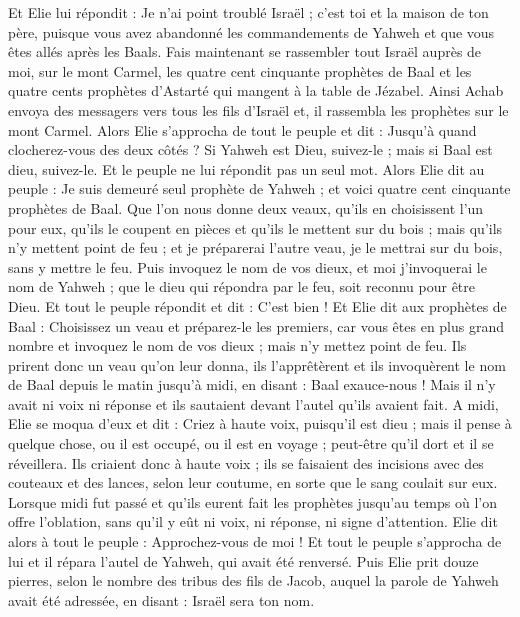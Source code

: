 \begin{multicols}{2}
Et Elie lui répondit : Je n'ai point troublé Israël ; c'est toi et la maison de ton père, puisque vous avez abandonné les commandements de Yahweh et que vous êtes allés après les Baals.
Fais maintenant se rassembler tout Israël auprès de moi, sur le mont Carmel, les quatre cent cinquante prophètes de Baal et les quatre cents prophètes d’Astarté qui mangent à la table de Jézabel.
Ainsi Achab envoya des messagers vers tous les fils d'Israël et, il rassembla les prophètes sur le mont Carmel.
Alors Elie s'approcha de tout le peuple et dit : Jusqu'à quand clocherez-vous des deux côtés ? Si Yahweh est Dieu, suivez-le ; mais si Baal est dieu, suivez-le. Et le peuple ne lui répondit pas un seul mot.
Alors Elie dit au peuple : Je suis demeuré seul prophète de Yahweh ; et voici quatre cent cinquante prophètes de Baal.
Que l’on nous donne deux veaux, qu'ils en choisissent l'un pour eux, qu'ils le coupent en pièces et qu'ils le mettent sur du bois ; mais qu'ils n'y mettent point de feu ; et je préparerai l'autre veau, je le mettrai sur du bois, sans y mettre le feu.
Puis invoquez le nom de vos dieux, et moi j'invoquerai le nom de Yahweh ; que le dieu qui répondra par le feu, soit reconnu pour être Dieu. Et tout le peuple répondit et dit : C'est bien !
Et Elie dit aux prophètes de Baal : Choisissez un veau et préparez-le les premiers, car vous êtes en plus grand nombre et invoquez le nom de vos dieux ; mais n'y mettez point de feu.
Ils prirent donc un veau qu'on leur donna, ils l'apprêtèrent et ils invoquèrent le nom de Baal depuis le matin jusqu'à midi, en disant : Baal exauce-nous ! Mais il n'y avait ni voix ni réponse et ils sautaient devant l'autel qu'ils avaient fait.
A midi, Elie se moqua d'eux et dit : Criez à haute voix, puisqu’il est dieu ; mais il pense à quelque chose, ou il est occupé, ou il est en voyage ; peut-être qu'il dort et il se réveillera.
Ils criaient donc à haute voix ; ils se faisaient des incisions avec des couteaux et des lances, selon leur coutume, en sorte que le sang coulait sur eux.
Lorsque midi fut passé et qu'ils eurent fait les prophètes jusqu'au temps où l’on offre l'oblation, sans qu'il y eût ni voix, ni réponse, ni signe d’attention.
Elie dit alors à tout le peuple : Approchez-vous de moi ! Et tout le peuple s'approcha de lui et il répara l'autel de Yahweh, qui avait été renversé.
Puis Elie prit douze pierres, selon le nombre des tribus des fils de Jacob, auquel la parole de Yahweh avait été adressée, en disant : Israël sera ton nom.

\end{multicols}
